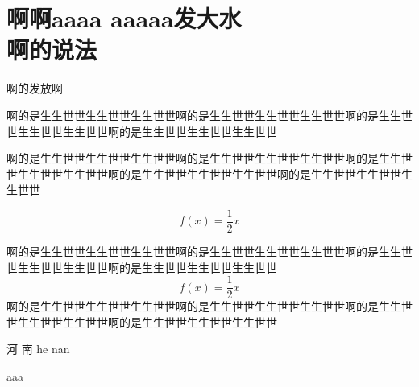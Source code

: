 \documentclass{article}
\begin{document}
\section{啊啊\textsf{aaaa} aaaaa发大水\\
啊的说法}

啊的发放啊

啊的是生生世世生生世世生生世世啊的是生生世世生生世世生生世世啊的是生生世世生生世世生生世世啊的是生生世世生生世世生生世世

啊的是生生世世生生世世生生世世啊的是生生世世生生世世生生世世啊的是生生世世生生世世生生世世啊的是生生世世生生世世生生世世啊的是生生世世生生世世生生世世

\[
f(x)=\frac{1}{2}x
\]

啊的是生生世世生生世世生生世世啊的是生生世世生生世世生生世世啊的是生生世世生生世世生生世世啊的是生生世世生生世世生生世世
\[
f(x)=\frac{1}{2}x
\]
啊的是生生世世生生世世生生世世啊的是生生世世生生世世生生世世啊的是生生世世生生世世生生世世啊的是生生世世生生世世生生世世

河 南  he nan   	

aaa
\end{document}
